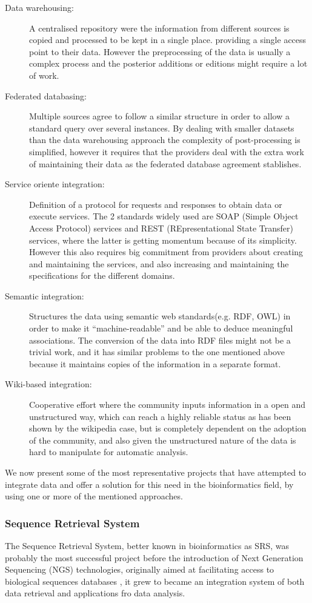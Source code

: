 \begin{description}
\item[Data warehousing:] 			A centralised repository were the information from different sources is copied and processed to be kept  in a single place. providing a single access point to their data. However the preprocessing of the data is usually a complex process and the posterior additions or editions might require a lot of work.
\item[Federated databasing:] 		Multiple sources agree to follow a similar structure in order to allow a standard query over several instances. By dealing with smaller datasets than the data warehousing approach the complexity of post-processing is simplified, however it requires that the providers deal with the extra work of maintaining their data as the federated database agreement stablishes.
\item[Service oriente integration:] 	Definition of a protocol for requests and responses to obtain data or execute services. The 2 standards widely used are SOAP (Simple Object Access Protocol) services and REST (REpresentational State Transfer) services, where the latter is getting momentum because of its simplicity. However this also requires big commitment from providers about creating and maintaining the services, and also increasing and maintaining the specifications for the different domains.
\item[Semantic integration:] 		Structures the data using semantic web standards(e.g. RDF, OWL) in order to make it ``machine-readable'' and be able to deduce meaningful associations. The conversion of the data into RDF files might not be a trivial work, and it has similar problems to the one mentioned above because it maintains copies of the information in a separate format. 
\item[Wiki-based integration:] 		Cooperative effort where the community inputs information in a open and unstructured way, which can reach a highly reliable status as has been shown by the wikipedia case, but is completely dependent on the adoption of the community, and also given the unstructured nature of the data is hard to manipulate for automatic analysis.
\end{description}

We now present some of the most representative projects that have attempted to integrate data and offer a solution for this need in the bioinformatics field, by using one or more of the mentioned approaches. 

\subsubsection{Sequence Retrieval System}
The Sequence Retrieval System, better known in bioinformatics as SRS, was probably the most successful project before the introduction of Next Generation Sequencing (NGS) technologies, originally aimed at facilitating access to biological sequences databases \cite{ETZ1996}, it grew to became an integration system of both data retrieval and applications fro data analysis.


